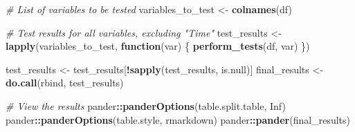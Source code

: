 \documentclass[
]{article}
\newenvironment{Shaded}{\begin{snugshade}}{\end{snugshade}}
\newcommand{\CommentTok}[1]{\textcolor[rgb]{0.56,0.35,0.01}{\textit{#1}}}
\newcommand{\ConstantTok}[1]{\textcolor[rgb]{0.56,0.35,0.01}{#1}}
\newcommand{\ControlFlowTok}[1]{\textcolor[rgb]{0.13,0.29,0.53}{\textbf{#1}}}
\newcommand{\FunctionTok}[1]{\textcolor[rgb]{0.13,0.29,0.53}{\textbf{#1}}}
\newcommand{\NormalTok}[1]{#1}
\newcommand{\OtherTok}[1]{\textcolor[rgb]{0.56,0.35,0.01}{#1}}
\newcommand{\SpecialCharTok}[1]{\textcolor[rgb]{0.81,0.36,0.00}{\textbf{#1}}}
\newcommand{\StringTok}[1]{\textcolor[rgb]{0.31,0.60,0.02}{#1}}
\begin{document}
\begin{Shaded}
\begin{Highlighting}[]
\CommentTok{\# List of variables to be tested}
\NormalTok{variables\_to\_test }\OtherTok{\textless{}{-}} \FunctionTok{colnames}\NormalTok{(df)}

\CommentTok{\# Test results for all variables, excluding "Time"}
\NormalTok{test\_results }\OtherTok{\textless{}{-}} \FunctionTok{lapply}\NormalTok{(variables\_to\_test, }\ControlFlowTok{function}\NormalTok{(var) \{}
  \FunctionTok{perform\_tests}\NormalTok{(df, var)}
\NormalTok{\})}

\NormalTok{test\_results }\OtherTok{\textless{}{-}}\NormalTok{ test\_results[}\SpecialCharTok{!}\FunctionTok{sapply}\NormalTok{(test\_results, is.null)]}
\NormalTok{final\_results }\OtherTok{\textless{}{-}} \FunctionTok{do.call}\NormalTok{(rbind, test\_results)}

\CommentTok{\# View the results}
\NormalTok{pander}\SpecialCharTok{::}\FunctionTok{panderOptions}\NormalTok{(}\StringTok{\textquotesingle{}table.split.table\textquotesingle{}}\NormalTok{, }\ConstantTok{Inf}\NormalTok{)}
\NormalTok{pander}\SpecialCharTok{::}\FunctionTok{panderOptions}\NormalTok{(}\StringTok{\textquotesingle{}table.style\textquotesingle{}}\NormalTok{, }\StringTok{\textquotesingle{}rmarkdown\textquotesingle{}}\NormalTok{)}
\NormalTok{pander}\SpecialCharTok{::}\FunctionTok{pander}\NormalTok{(final\_results)}
\end{Highlighting}
\end{Shaded}
\end{document}
